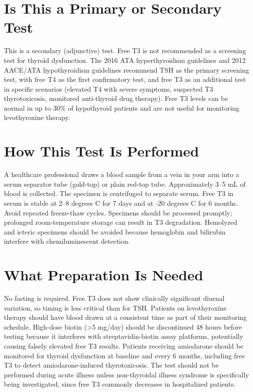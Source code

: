 \section*{Is This a Primary or Secondary Test}
This is a secondary (adjunctive) test. Free T3 is not recommended as a screening test for thyroid dysfunction. The 2016 ATA hyperthyroidism guidelines and 2012 AACE/ATA hypothyroidism guidelines recommend TSH as the primary screening test, with free T4 as the first confirmatory test, and free T3 as an additional test in specific scenarios (elevated T4 with severe symptoms, suspected T3 thyrotoxicosis, monitored anti-thyroid drug therapy). Free T3 levels can be normal in up to 30\% of hypothyroid patients and are not useful for monitoring levothyroxine therapy.

\section*{How This Test Is Performed}
A healthcare professional draws a blood sample from a vein in your arm into a serum separator tube (gold-top) or plain red-top tube. Approximately 3--5 mL of blood is collected. The specimen is centrifuged to separate serum. Free T3 in serum is stable at 2--8 degrees C for 7 days and at -20 degrees C for 6 months. Avoid repeated freeze-thaw cycles. Specimens should be processed promptly; prolonged room-temperature storage can result in T3 degradation. Hemolyzed and icteric specimens should be avoided because hemoglobin and bilirubin interfere with chemiluminescent detection.

\section*{What Preparation Is Needed}
No fasting is required. Free T3 does not show clinically significant diurnal variation, so timing is less critical than for TSH. Patients on levothyroxine therapy should have blood drawn at a consistent time as part of their monitoring schedule. High-dose biotin (>5 mg/day) should be discontinued 48 hours before testing because it interferes with streptavidin-biotin assay platforms, potentially causing falsely elevated free T3 results. Patients receiving amiodarone should be monitored for thyroid dysfunction at baseline and every 6 months, including free T3 to detect amiodarone-induced thyrotoxicosis. The test should not be performed during acute illness unless non-thyroidal illness syndrome is specifically being investigated, since free T3 commonly decreases in hospitalized patients.

